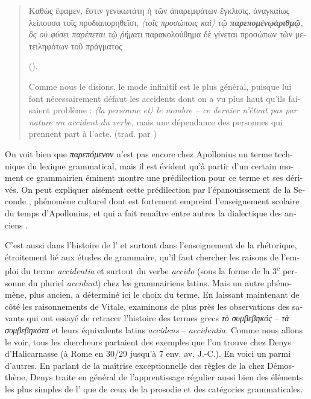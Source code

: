 \documentclass[french,output=paper,colorlinks,citecolor=brown]{../langscibook}
\begin{document}
\begin{otherlanguage}{french}
\begin{quote}
    \begin{otherlanguage}{greek}
    Καθὼς ἔφαμεν, ἔστιν γενικωτάτη ἡ τῶν ἀπαρεμφάτων ἔγκλισις, ἀναγκαίως λείπουσα τοῖς προδιαπορηθεῖσι, \textit{〈τοῖς προσώποις καὶ〉 τῷ {\textbf{{παρεπομένῳ\linebreak ἀριθμῷ}}, ὃς οὐ φύσει παρέπεται τῷ ῥήματι}} παρακολούθημα δὲ γίνεται προ\-σώπων τῶν μετειληφότων τοῦ πράγματος
    \end{otherlanguage} ().
    
    Comme nous le disions, le mode infinitif est le plus général, puisque lui font nécessairement défaut les accidents dont on a vu plus haut qu’ils faisaient problème : \textit{〈la personne et〉 le nombre – ce dernier n’étant pas par nature un accident du verbe,} mais une dépendance des personnes qui prennent part à l’acte. (trad. par \citealt[327]{Lallot1997})

\end{quote}

On voit bien que \textit{παρεπόμενον} n’est pas encore chez Apollonius un terme technique du lexique grammatical, mais il est évident qu’à partir d’un certain moment ce grammairien éminent montre une prédilection pour ce terme et ses dérivés. On peut expliquer aisément cette prédilection par l’épanouissement de la Seconde , phénomène culturel dont est fortement empreint l’enseignement scolaire du temps d’Apollonius, et qui a fait renaître entre autres la dialectique des anciens . 

C’est aussi dans l’histoire de l’ et surtout dans l’enseignement de la rhétorique, étroitement lié aux études de grammaire, qu’il faut chercher les raisons de l’emploi du terme \textit{accidentia} et surtout du verbe \textit{accido} (sous la forme de la 3\textsuperscript{e} personne du pluriel \textit{accidunt}) chez les grammairiens latins. Mais un autre phénomène, plus ancien, a déterminé ici le choix du terme. En laissant maintenant de côté les raisonnements de Vitale, examinons de plus près les observations des savants qui ont essayé de retracer l’histoire des termes grecs \textit{τὸ συμβεβηκός} – \textit{τὰ συμβεβηκότα} et leurs équivalents latins \textit{accidens} – \textit{accidentia.} Comme nous allons le voir, tous les chercheurs partaient des exemples que l’on trouve chez Denys d’Halicarnasse (à Rome en 30/29 jusqu’à 7 env. av. J.-C.). En voici un parmi d’autres. En parlant de la maîtrise exceptionnelle des règles de la  chez Démosthène, Denys traite en général de l’apprentissage régulier aussi bien des éléments les plus simples de l’ que de ceux de la prosodie et des catégories grammaticales. 


\end{otherlanguage}
\end{document}
